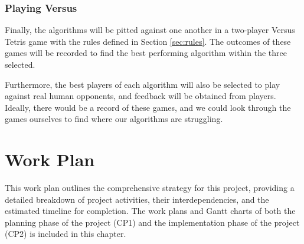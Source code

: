 \documentclass[a4paper, 12pt]{extreport}
\begin{document}
			\subsection{Playing Versus}
			
				Finally, the algorithms will be pitted against one another in a two-player Versus Tetris game with the rules defined in Section \ref{sec:rules}. The outcomes of these games will be recorded to find the best performing algorithm within the three selected.
				
				Furthermore, the best players of each algorithm will also be selected to play against real human opponents, and feedback will be obtained from players. Ideally, there would be a record of these games, and we could look through the games ourselves to find where our algorithms are struggling.
	
	\chapter{Work Plan}
		
		
		This work plan outlines the comprehensive strategy for this project, providing a detailed breakdown of project activities, their interdependencies, and the estimated timeline for completion. The work plans and Gantt charts of both the planning phase of the project (CP1) and the implementation phase of the project (CP2) is included in this chapter.
		
\end{document}
